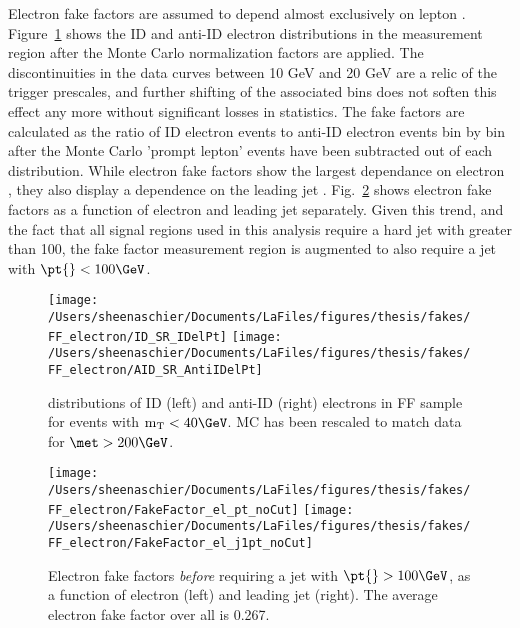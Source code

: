 Electron fake factors are assumed to depend almost exclusively on lepton \pt.  Figure~\ref{fig:elec_FF_dists_pt} shows the ID and anti-ID electron \pt distributions in the measurement region after the Monte Carlo normalization factors are applied.  The discontinuities in the data curves between 10 GeV and 20 GeV are a relic of the trigger prescales, and further shifting of the associated \pt bins does not soften this effect any more without significant losses in statistics.  The fake factors are calculated as the ratio of ID electron events to anti-ID electron events bin by bin after the Monte Carlo 'prompt lepton' events have been subtracted out of each \pt distribution.  While electron fake factors show the largest dependance on electron \pt{}, they also display a dependence on the leading jet \pt{}.  Fig.~\ref{fig:elec_FF_hist_noCut} shows electron fake factors as a function of electron \pt{} and leading jet \pt{} separately. Given this trend, and the fact that all signal regions used in this analysis require a hard jet with \pt{} greater than 100\GeV, the fake factor measurement region is augmented to also require a jet with $\pt{} < 100\GeV$.  
 \begin{figure}[tbp]
  \centering
  \texttt{[image: /Users/sheenaschier/Documents/LaFiles/figures/thesis/fakes/FF\_electron/ID\_SR\_IDelPt]}
  \texttt{[image: /Users/sheenaschier/Documents/LaFiles/figures/thesis/fakes/FF\_electron/AID\_SR\_AntiIDelPt]}\\
  \caption{\pt{} distributions of ID (left) and anti-ID (right) electrons in FF sample for events with $\mathrm{m_T} < 40\GeV$.  MC has been rescaled to match data for $\met > 200\GeV$.}
  \label{fig:elec_FF_dists_pt}
\end{figure}
\begin{figure}[tbp]
  \centering
  \texttt{[image: /Users/sheenaschier/Documents/LaFiles/figures/thesis/fakes/FF\_electron/FakeFactor\_el\_pt\_noCut]}
  \texttt{[image: /Users/sheenaschier/Documents/LaFiles/figures/thesis/fakes/FF\_electron/FakeFactor\_el\_j1pt\_noCut]}\\
  \caption{Electron fake factors \textit{before} requiring a jet with $\pt{} > 100\GeV$, as a function of electron \pt{} (left) and leading jet \pt{} (right).  The average electron fake factor over all \pt{} is 0.267. }
  \label{fig:elec_FF_hist_noCut}
\end{figure}


